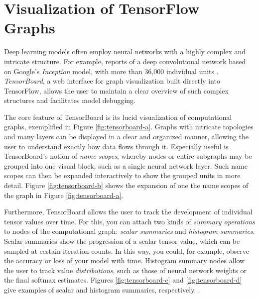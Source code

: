 \section{Visualization of TensorFlow Graphs}\label{sec:visual}

Deep learning models often employ neural networks with a highly complex and
intricate structure. For example, \cite{tensorflow} reports of a deep
convolutional network based on Google's \emph{Inception} model, with more than
36,000 individual units \cite{inception}. \emph{TensorBoard}, a web interface
for graph visualization built directly into TensorFlow, allows the user to
maintain a clear overview of such complex structures and facilitates model
debugging.

The core feature of TensorBoard is its lucid visualization of computational
graphs, exemplified in Figure \ref{fig:tensorboard-a}. Graphs with intricate
topologies and many layers can be displayed in a clear and organized manner,
allowing the user to understand exactly how data flows through it. Especially
useful is TensorBoard's notion of \emph{name scopes}, whereby nodes or entire
subgraphs may be grouped into one visual block, such as a single neural network
layer. Such name scopes can then be expanded interactively to show the grouped
units in more detail. Figure \ref{fig:tensorboard-b} shows the expansion of one
the name scopes of the graph in Figure \ref{fig:tensorboard-a}.

Furthermore, TensorBoard allows the user to track the development of individual
tensor values over time. For this, you can attach two kinds of \emph{summary
  operations} to nodes of the computational graph: \emph{scalar summaries} and
\emph{histogram summaries}. Scalar summaries show the progression of a scalar
tensor value, which can be sampled at certain iteration counts. In this way, you
could, for example, observe the accuracy or loss of your model with
time. Histogram summary nodes allow the user to track value
\emph{distributions}, such as those of neural network weights or the final
softmax estimates. Figures \ref{fig:tensorboard-c} and \ref{fig:tensorboard-d}
give examples of scalar and histogram summaries, respectively.
\cite{tensorflow}.

